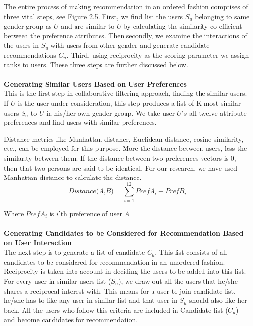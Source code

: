 \documentclass[12pt,oneside]{book}
\begin{document}
The entire process of making recommendation in an ordered fashion comprises of three vital steps, see Figure 2.5. First, we find list the users $S_u$ belonging to same gender group as $U$ and are similar to $U$ by calculating the similarity co-efficient between the preference attributes. Then secondly, we examine the interactions of the users in $S_u$ with users from other gender and generate candidate recommendations $C_u$. Third, using reciprocity as the scoring parameter we assign ranks to users. These three steps are further discussed below.\\\\
\textbf{Generating Similar Users Based on User Preferences}\\
This is the first step in collaborative filtering approach, finding the similar users. If $U$ is the user under consideration, this step produces a list of K most similar users $S_u$ to $U$ in his/her own gender group. We take user $U's$ all twelve attribute preferences and find users with similar preferences. 

Distance metrics like Manhattan distance, Euclidean distance, cosine similarity, etc., can be employed for this purpose. More the distance between users, less the similarity between them. If the distance between two preferences vectors is 0, then that two persons are said to be identical. For our research, we have used Manhattan distance to calculate the distance. 
$$\textit{Distance(A,B)} = \sum_{i=1}^{12} PrefA_i - PrefB_i$$

Where $PrefA_i$ is $i$'th preference of user $A$\\\\
\textbf{Generating Candidates to be Considered for Recommendation Based on User Interaction}\\
The next step is to generate a list of candidate $C_u$. This list consists of all candidates to be considered for recommendation in an unordered fashion. Reciprocity is taken into account in deciding the users to be added into this list. For every user in similar users list ($S_u$), we draw out all the users that he/she shares a reciprocal interest with. This means for a user to join candidate list, he/she has to like any user in similar list and that user in $S_u$ should also like her back.  All the users who follow this criteria are included in Candidate list ($C_u$) and  become candidates for
recommendation. 
\end{document}
